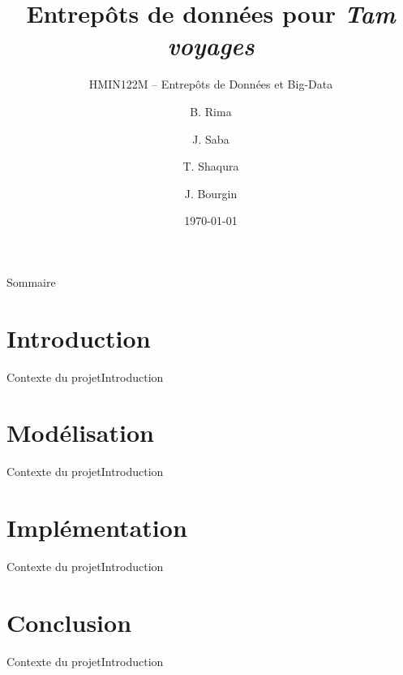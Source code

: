 \documentclass[usenames,dvipsnames]{beamer}
\title{Entrepôts de données pour \textit{Tam voyages}}
\subtitle{HMIN122M -- Entrepôts de Données et Big-Data}
\author{B. Rima \and J. Saba \and T. Shaqura \and J. Bourgin}
\institute[UM]{M1 Informatique AIGLE}
\date{\today}
\begin{document}
\begin{frame}
\titlepage
\end{frame}
\begin{frame}{Sommaire}
\tableofcontents
\end{frame}
\section{Introduction}
\begin{frame}{Contexte du projet}{Introduction}
\end{frame}

\section{Modélisation}
\begin{frame}{Contexte du projet}{Introduction}
\end{frame}

\section{Implémentation}
\begin{frame}{Contexte du projet}{Introduction}
\end{frame}

\section{Conclusion}
\begin{frame}{Contexte du projet}{Introduction}
\end{frame}
\end{document}
